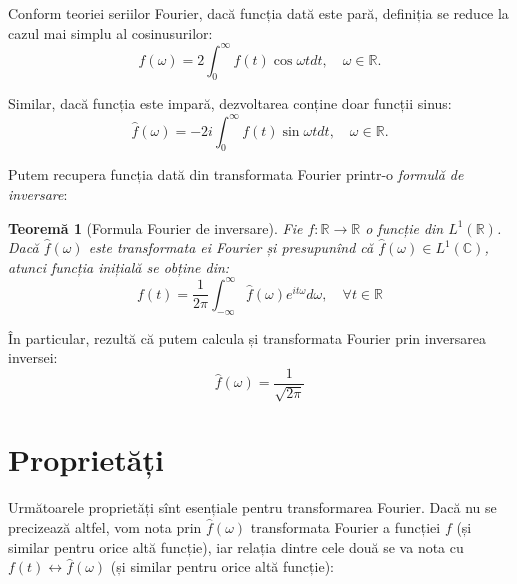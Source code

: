 \documentclass[12pt,a4paper]{article}
\newcommand\RR{\mathbb{R}}
\newcommand\CC{\mathbb{C}}
\theoremstyle{dotless}
\newtheorem{theorem}{Teorem\u{a}}
\theoremstyle{dotlessdr}
\begin{document}
Conform teoriei seriilor Fourier, dacă funcția dată este pară, definiția se reduce
la cazul mai simplu al cosinusurilor:
\begin{equation}
  \label{eq:transf-f-cos}
  \widehat{f}(\omega) = 2 \int_0^\infty f(t) \cos \omega t dt, \quad \omega \in \RR.
\end{equation}

Similar, dacă funcția este impară, dezvoltarea conține doar funcții sinus:
\begin{equation}
  \label{eq:transf-f-sin}
  \widehat{f}(\omega) = -2i \int_0^\infty f(t) \sin \omega t dt, \quad \omega \in \RR.
\end{equation}

Putem recupera funcția dată din transformata Fourier printr-o \emph{formulă de inversare}:

\begin{theorem}[Formula Fourier de inversare]\label{thm:fourier-inv}
  Fie $ f : \RR \to \RR $ o funcție din $ L^1(\RR) $. Dacă $ \widehat{f}(\omega) $ este
  transformata ei Fourier și presupunînd că $ \widehat{f}(\omega) \in L^1(\CC) $,
  atunci funcția inițială se obține din:
  \begin{equation}
    \label{eq:transf-f-inv}
    f(t) = \frac{1}{2\pi} \int_{-\infty}^\infty \widehat{f}(\omega) e^{it\omega} d\omega, %
    \quad \forall t \in \RR
  \end{equation}
\end{theorem}

În particular, rezultă că putem calcula și transformata Fourier prin inversarea
inversei:
\begin{equation}
  \label{eq:transf-f-iinv}
  \widehat{f}(\omega) = \frac{1}{\sqrt{2\pi}}
\end{equation}


\section*{Proprietăți}

\indent\indent Următoarele proprietăți sînt esențiale pentru transformarea Fourier.
Dacă nu se precizează altfel, vom nota prin $ \widehat{f}(\omega) $ transformata
Fourier a funcției $ f $ (și similar pentru orice altă funcție), iar relația dintre
cele două se va nota cu $ f(t) \leftrightarrow \widehat{f}(\omega) $ (și similar
pentru orice altă funcție):
\end{document}
